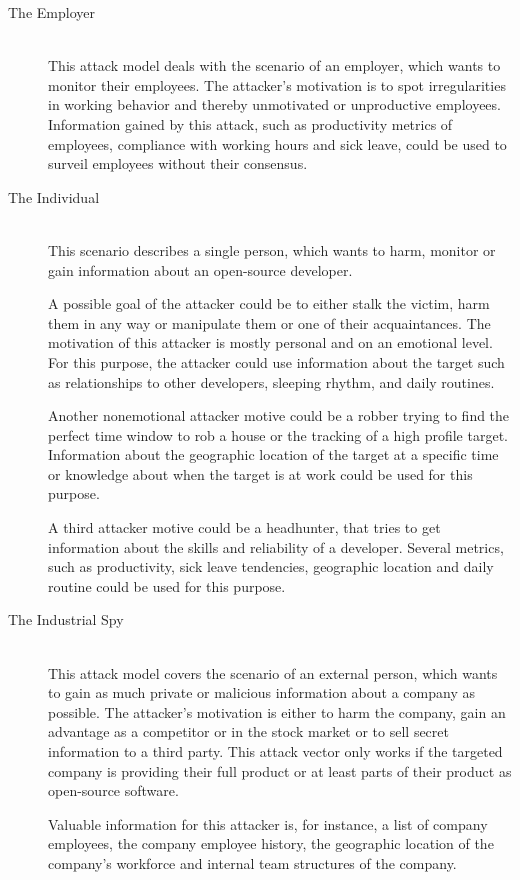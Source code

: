 \begin{description}
    \item[The Employer] \hfill \\
        This attack model deals with the scenario of an employer, which wants to monitor their employees.
        The attacker's motivation is to spot irregularities in working behavior and thereby unmotivated or unproductive employees.
        Information gained by this attack, such as productivity metrics of employees, compliance with working hours and sick leave, could be used to surveil employees without their consensus.

    \item[The Individual] \hfill \\
        This scenario describes a single person, which wants to harm, monitor or gain information about an open-source developer.

        A possible goal of the attacker could be to either stalk the victim, harm them in any way or manipulate them or one of their acquaintances.
        The motivation of this attacker is mostly personal and on an emotional level.
        For this purpose, the attacker could use information about the target such as relationships to other developers, sleeping rhythm, and daily routines.

        Another nonemotional attacker motive could be a robber trying to find the perfect time window to rob a house or the tracking of a high profile target.
        Information about the geographic location of the target at a specific time or knowledge about when the target is at work could be used for this purpose.

        A third attacker motive could be a headhunter, that tries to get information about the skills and reliability of a developer.
        Several metrics, such as productivity, sick leave tendencies, geographic location and daily routine could be used for this purpose.

    \item[The Industrial Spy]~\label{attack:industrial-spy} \hfill \\
        This attack model covers the scenario of an external person, which wants to gain as much private or malicious information about a company as possible.
        The attacker's motivation is either to harm the company, gain an advantage as a competitor or in the stock market or to sell secret information to a third party.
        This attack vector only works if the targeted company is providing their full product or at least parts of their product as open-source software.

        Valuable information for this attacker is, for instance, a list of company employees, the company employee history, the geographic location of the company's workforce and internal team structures of the company.
\end{description}


